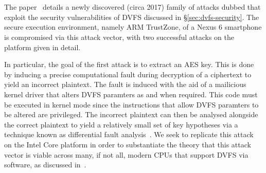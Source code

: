 \section{\clkscrew{}}

The \clkscrew{} paper~\cite{clkscrew} details a newly discovered (circa 2017)
family of attacks dubbed \clkscrew{} that exploit the security vulnerabilities
of DVFS discussed in §\ref{sec:dvfs-security}. The secure execution environment,
namely ARM TrustZone, of a Nexus 6 smartphone is compromised via this attack
vector, with two successful attacks on the platform given in detail.

In particular, the goal of the first attack is to extract an AES key. This is
done by inducing a precise computational fault during decryption of a ciphertext
to yield an incorrect plaintext. The fault is induced with the aid of a
mailicious kernel driver that alters DVFS paramters as and when required. This
code must be executed in kernel mode since the instructions that allow DVFS
paramters to be altered are privileged. The incorrect plaintext can then be
analysed alongside the correct plaintext to yield a relatively small set of key 
hypotheses via a technique known as differential fault analysis~\cite{tunstallDFA}.
We seek to replicate this attack on the Intel Core platform in order to
substantiate the theory that this attack vector is viable across many, if not
all, modern CPUs that support DVFS via software, as discussed in~\cite[§6.1]{clkscrew}.
